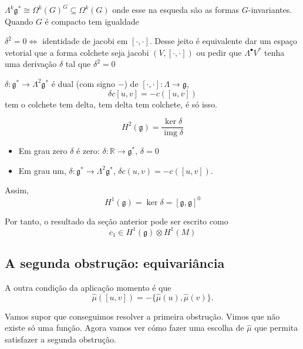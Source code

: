 \begin{remark}\leavevmode
	$\Lambda^k\mathfrak{g}^*\cong \Omega^k(G)^G\subseteq \Omega^{k}(G)$ onde esse na esqueda são as formas $G$-invariantes. Quando $G$ é compacto tem igualdade
\end{remark}

 \begin{exercise}\leavevmode
	 $\delta^2=0\iff$ identidade de jacobi em $[\cdot,\cdot ]$. Desse jeito é equivalente dar um espaço vetorial que a forma colchete seja jacobi $(V,[\cdot,\cdot ])$ ou pedir que $\Lambda^\bullet V^*$ tenha uma derivação $\delta$  tal que $\delta^2=0$
\end{exercise}

\begin{remark}\leavevmode
	$\delta:\mathfrak{g}^*\to \Lambda^2\mathfrak{g}^*$ é dual (com signo $-$) de $[\cdot,\cdot ]:\Lambda\to \mathfrak{g}$,
	\[\delta c[u,v]=-c([u,v])\]
	tem o colchete tem delta, tem delta tem colchete, é só isso.
\end{remark}

\begin{defn}\leavevmode
	\[H^{2}(\mathfrak{g})=\frac{\ker \delta}{\operatorname{img} \delta}\]
\end{defn}

\begin{remark}\leavevmode
	\begin{itemize}
	\item Em grau zero $\delta$ é zero: $\delta:\mathbb{R}\to \mathfrak{g}^*$, $\delta=0$
	\item Em grau um, $\delta:\mathfrak{g}^*\to \Lambda^2\mathfrak{g}^*$, $\delta c(u,v)=-c([u,v])$.
	\end{itemize}
	Assim,
	\[H^{1}(\mathfrak{g})=\ker \delta=[\mathfrak{g},\mathfrak{g} ]^0\]
\end{remark}
Por tanto, o resultado da seção anterior pode ser escrito como
\[c_1\in H^{1}(\mathfrak{g})\otimes H^{1}(M)\]

\subsection{A segunda obstrução: equivariância}
A outra condição da aplicação momento é que
\[\hat{\mu}([u,v])=-\{\hat{\mu}(u),\hat{\mu}(v)\}.\]

Vamos supor que conseguimos resolver a primeira obstrução. Vimos que não existe só uma função.  Agora vamos ver cómo fazer uma escolha de $\hat{\mu}$ que permita satisfazer a segunda obstrução.

